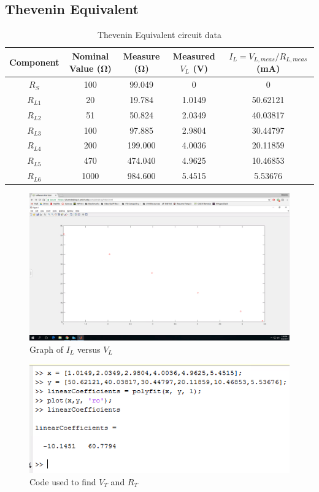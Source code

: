 \documentclass[10pt]{article}
\begin{document}
\subsection*{Thevenin Equivalent}
\begin{table}[H]
	\centering
	\begin{tabular}{|c|c|c|c|c|}
		\hline
		\textbf{Component} & \textbf{Nominal Value (\si{\ohm})} & \textbf{Measure (\si{\ohm})} & \textbf{Measured \(V_L\) (V)} & \textbf{\(I_L = V_{L,meas}/R_{L,meas}\) (mA)} \\
		\hline
		\(R_S\) & 100 & 99.049 & 0 & 0 \\
		\hline
		\(R_{L1}\) & 20 & 19.784 & 1.0149 & 50.62121 \\
		\hline
		\(R_{L2}\) & 51 & 50.824 & 2.0349 & 40.03817 \\
		\hline
		\(R_{L3}\) & 100 & 97.885 & 2.9804 & 30.44797 \\
		\hline
		\(R_{L4}\) & 200 & 199.000 & 4.0036 & 20.11859 \\
		\hline
		\(R_{L5}\) & 470 & 474.040 & 4.9625 & 10.46853 \\
		\hline
		\(R_{L6}\) & 1000 & 984.600 & 5.4515 & 5.53676 \\
		\hline
	\end{tabular}
	\caption{Thevenin Equivalent circuit data}
\end{table}
\begin{figure}[H]
	\centering
	\includegraphics[width=\textwidth]{TheveninGraph}
	\caption{Graph of \(I_L\) versus \(V_L\)}
\end{figure}
\begin{figure}[H]
	\centering
	\includegraphics[width=\textwidth]{TheveninCode}
	\caption{Code used to find \(V_T\) and \(R_T\)}
\end{figure}
\end{document}

